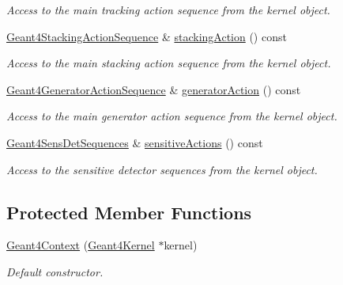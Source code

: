 \begin{DoxyCompactItemize}
\begin{DoxyCompactList}\small\item\em Access to the main tracking action sequence from the kernel object. \item\end{DoxyCompactList}\item 
\hyperlink{class_d_d4hep_1_1_simulation_1_1_geant4_stacking_action_sequence}{Geant4StackingActionSequence} \& \hyperlink{class_d_d4hep_1_1_simulation_1_1_geant4_context_aedd2b364c13faaf80b4ecfb9ceefefb0}{stackingAction} () const 
\begin{DoxyCompactList}\small\item\em Access to the main stacking action sequence from the kernel object. \item\end{DoxyCompactList}\item 
\hyperlink{class_d_d4hep_1_1_simulation_1_1_geant4_generator_action_sequence}{Geant4GeneratorActionSequence} \& \hyperlink{class_d_d4hep_1_1_simulation_1_1_geant4_context_a3bdbd4b579206f42311dec78bae10aab}{generatorAction} () const 
\begin{DoxyCompactList}\small\item\em Access to the main generator action sequence from the kernel object. \item\end{DoxyCompactList}\item 
\hyperlink{class_d_d4hep_1_1_simulation_1_1_geant4_sens_det_sequences}{Geant4SensDetSequences} \& \hyperlink{class_d_d4hep_1_1_simulation_1_1_geant4_context_a0c2bae0f1ec60b88ff9db373e0cfe0b4}{sensitiveActions} () const 
\begin{DoxyCompactList}\small\item\em Access to the sensitive detector sequences from the kernel object. \item\end{DoxyCompactList}\end{DoxyCompactItemize}
\subsection*{Protected Member Functions}
\begin{DoxyCompactItemize}
\item 
\hyperlink{class_d_d4hep_1_1_simulation_1_1_geant4_context_a95592e635ace3345c980cb855cd370a6}{Geant4Context} (\hyperlink{class_d_d4hep_1_1_simulation_1_1_geant4_kernel}{Geant4Kernel} $\ast$kernel)
\begin{DoxyCompactList}\small\item\em Default constructor. \item\end{DoxyCompactList}\end{DoxyCompactItemize}
